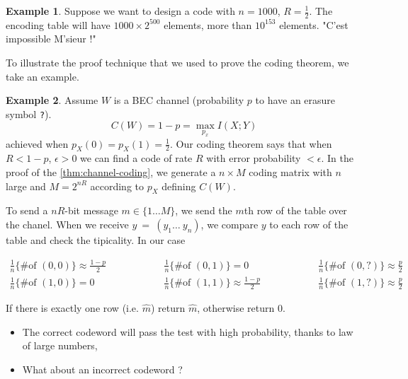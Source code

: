 \documentclass[twoside]{article}
\theoremstyle{definition} %
\newtheorem{example}{Example}
\begin{document}
\begin{example}
  Suppose we want to design a code with $n=1000$, $R=\frac 1 2$. The encoding table will have $1000 \times 2^{500}$ elements, more than $10^{153}$ elements. "C'est impossible M'sieur !"
\end{example}




To illustrate the proof technique that we used to prove the coding theorem, we take an example.

\begin{example}
  Assume $W$ is a BEC channel (probability $p$ to have an erasure symbol \texttt{?}).
  \[
    C(W) = 1-p = \max_{p_x} I(X;Y)
  \]
  achieved when $p_X(0)=p_X(1)=\frac 1 2$. Our coding theorem says that when $R<1-p$, $\epsilon > 0$ we can find a code of rate $R$ with error probability $< \epsilon$. In the proof of the \cref{thm:channel-coding}, we generate a $n\times M$ coding matrix with $n$ large and $M=2^{nR}$ according to $p_X$ defining $C(W)$.

  To send a $nR$-bit message $m \in \{1 \dots M\}$, we send the $m$th row of the table over the chanel. When we receive $y~=~(y_1\dots~y_n)$, we compare $y$ to each row of the table and check the tipicality. In our case

  \begin{align*}
    \frac 1 n \{\text{\# of }(0,0)\} \approx \frac {1-p} 2 \hspace{5em}&
    \frac 1 n \{\text{\# of }(0,1)\} = 0 \hspace{5em}&
    \frac 1 n \{\text{\# of }(0,?)\} \approx \frac p 2 \\
    \frac 1 n \{\text{\# of }(1,0)\} = 0 \hspace{5em}&
    \frac 1 n \{\text{\# of }(1,1)\} \approx \frac {1-p} 2 \hspace{5em}&
    \frac 1 n \{\text{\# of }(1,?)\} \approx \frac p 2
  \end{align*}

  If there is exactly one row (i.e. $\hat m$) return $\hat m$, otherwise return $0$.

  \begin{itemize}
    \item The correct codeword will pass the test with high probability, thanks to law of large numbers,
    \item What about an incorrect codeword ?
  \end{itemize}


\end{example}
\end{document}
